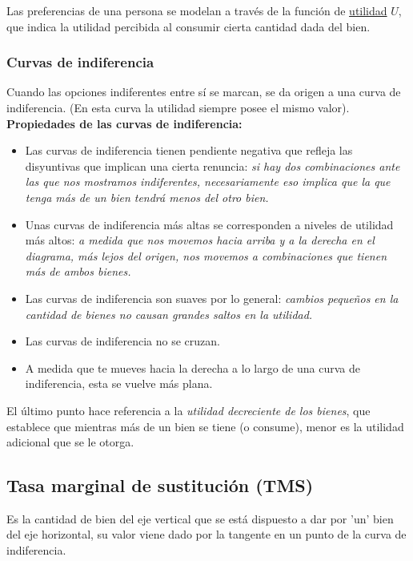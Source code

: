 Las preferencias de una persona se modelan a través de la función de \hyperlink{utilidad}{utilidad} $U$, que indica la utilidad percibida al consumir cierta cantidad dada del bien.

\subsubsection{Curvas de indiferencia}
Cuando las opciones indiferentes entre sí se marcan, se da origen a una curva de indiferencia. (En esta curva la utilidad siempre posee el mismo valor). 
\\

\textbf{Propiedades de las curvas de indiferencia:}

\begin{itemize}
    \item Las curvas de indiferencia tienen pendiente negativa que refleja las disyuntivas que implican una cierta renuncia: \textit{si hay dos combinaciones ante las que nos mostramos indiferentes, necesariamente eso implica que la que tenga más de un bien tendrá menos del otro bien.}
    \item Unas curvas de indiferencia más altas se corresponden a niveles de utilidad más altos: \textit{a medida que nos movemos hacia arriba y a la derecha en el diagrama, más lejos del origen, nos movemos a combinaciones que tienen más de ambos bienes.}
    \item Las curvas de indiferencia son suaves por lo general: \textit{cambios pequeños en la cantidad de bienes no causan grandes saltos en la utilidad.}
    \item Las curvas de indiferencia no se cruzan.
    \item A medida que te mueves hacia la derecha a lo largo de una curva de indiferencia, esta se vuelve más plana.
\end{itemize}

El último punto hace referencia a la \textit{utilidad decreciente de los bienes}, que establece que mientras más de un bien se tiene (o consume), menor es la utilidad adicional que se le otorga.

\subsection{Tasa marginal de sustitución (TMS)}
Es la cantidad de bien del eje vertical que se está dispuesto a dar por 'un' bien del eje horizontal, su valor viene dado por la tangente en un punto de la curva de indiferencia.

